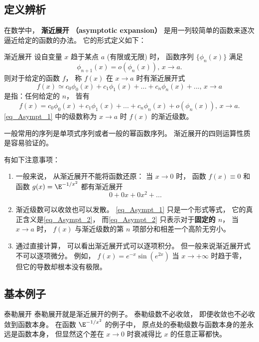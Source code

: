 

\subsection{定义辨析}\label{sub_Asympt_1}
在数学中， \textbf{渐近展开 （asymptotic expansion）} 是用一列较简单的函数来逐次逼近给定的函数的办法。 它的形式定义如下：

\begin{definition}{渐近展开}
设自变量 $x$ 趋于某点 $a$ (有限或无限) 时， 函数序列 $\{\phi_{n}(x)\}$ 满足
$$
\phi_{n+1}(x)=o(\phi_n(x)),\,x\to a.
$$
则对于给定的函数 $f$， 称 $f(x)$ 在 $x\to a$ 时有渐近展开式
\begin{equation}\label{eq_Asympt_1}
f(x)\simeq c_0\phi_0(x)+c_1\phi_1(x)+...+c_n\phi_n(x)+...,\,x\to a
\end{equation}
是指：任何给定的 $n$， 皆有
\begin{equation}\label{eq_Asympt_2}
f(x)=c_0\phi_0(x)+c_1\phi_1(x)+...+c_n\phi_n(x)+o(\phi_n(x)),\,x\to a.
\end{equation}
\autoref{eq_Asympt_1} 中的级数称为 $x\to a$ 时 $f(x)$ 的渐近级数。
\end{definition}

一般常用的序列是单项式序列或者一般的幂函数序列。 渐近展开的四则运算性质是容易验证的。

有如下注意事项：
\begin{enumerate}
\item 一般来说， 从渐近展开不能将函数还原： 当 $x\to0$ 时， 函数 $f(x)\equiv 0$ 和函数 $g(x)=\E^{-1/x^2}$ 都有渐近展开
$$
0+0x+0x^2+...
$$

\item 渐近级数可以收敛也可以发散。 \autoref{eq_Asympt_1} 只是一个形式等式， 它的真正含义是\autoref{eq_Asympt_2}，  而\autoref{eq_Asympt_2} 只表示对于\textbf{固定的 $n$}， 当 $x\to a$ 时， $f(x)$ 与渐近级数的第 $n$ 项部分和相差一个高阶无穷小。 

\item 通过直接计算， 可以看出渐近展开式可以逐项积分。 但一般来说渐近展开式不可以逐项微分。 例如， $f(x)=e^{-x}\sin(e^{2x})$ 当 $x\to+\infty$ 时趋于零， 但它的导数却根本没有极限。
\end{enumerate}

\subsection{基本例子}
\begin{example}{泰勒展开}
泰勒展开就是渐近展开的例子。 泰勒级数不必收敛， 即便收敛也不必收敛到函数本身。 在函数 $\E^{-1/x^2}$ 的例子中， 原点处的泰勒级数与函数本身的差永远是函数本身， 但显然这个差在 $x\to0$ 时衰减得比 $x$ 的任意正幂都快。
\end{example}

